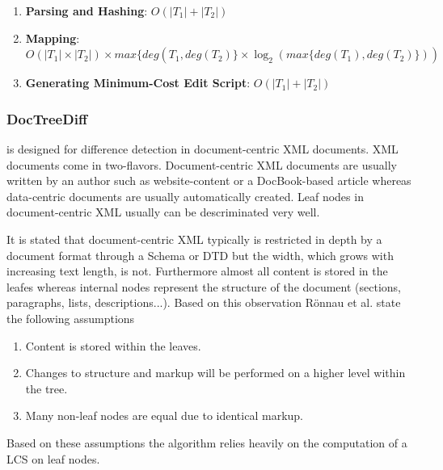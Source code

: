 \begin{enumerate}
\item {\bf{Parsing and Hashing}}: $O(|T_{1}| + |T_{2}|)$
\item {\bf{Mapping}}: $O(|T_{1}| \times |T_{2}|) \times max\{deg(T_{1}, deg(T_{2})\} \times \log_{2}(max\{deg(T_{1}), deg(T_{2})\}))$
\item {\bf{Generating Minimum-Cost Edit Script}}: $O(|T_{1}| + |T_{2}|)$
\end{enumerate}

\subsubsection{DocTreeDiff\cite{ronnau2009efficient}}
is designed for difference detection in document-centric XML documents. XML documents come in two-flavors. Document-centric XML documents are usually written by an author such as website-content or a DocBook-based article whereas data-centric documents are usually automatically created. Leaf nodes in document-centric XML usually can be descriminated very well.

It is stated that document-centric XML typically is restricted in depth by a document format through a Schema or DTD but the width, which grows with increasing text length, is not. Furthermore almost all content is stored in the leafes whereas internal nodes represent the structure of the document (sections, paragraphs, lists, descriptions...). Based on this observation R\"onnau et al. state the following assumptions

\begin{enumerate}
\item Content is stored within the leaves.
\item Changes to structure and markup will be performed on a higher level within the tree.
\item Many non-leaf nodes are equal due to identical markup.
\end{enumerate}

Based on these assumptions the algorithm relies heavily on the computation of a LCS on leaf nodes.

